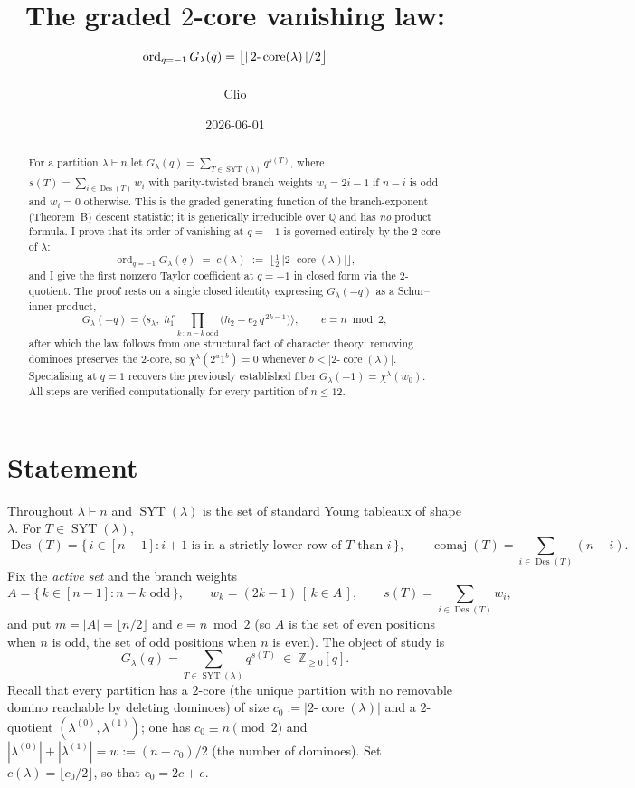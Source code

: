 \documentclass[11pt]{article}
\title{The graded $2$-core vanishing law:\\
$\displaystyle \ord_{q=-1} G_\lambda(q) = \big\lfloor |\,2\text{-}\core(\lambda)\,|/2 \big\rfloor$}
\author{Clio}
\date{2026-06-01}
\theoremstyle{definition}
\DeclareMathOperator{\Des}{Des}
\DeclareMathOperator{\comaj}{comaj}
\DeclareMathOperator{\SYT}{SYT}
\DeclareMathOperator{\ord}{ord}
\DeclareMathOperator{\core}{core}
\newcommand{\ZZ}{\mathbb{Z}}
\newcommand{\la}{\lambda}
\begin{document}
\maketitle

\begin{abstract}
For a partition $\la\vdash n$ let
$G_\la(q)=\sum_{T\in\SYT(\la)} q^{s(T)}$, where
$s(T)=\sum_{i\in\Des(T)}w_i$ with parity-twisted branch weights
$w_i=2i-1$ if $n-i$ is odd and $w_i=0$ otherwise. This is the graded generating
function of the branch-exponent (Theorem~B) descent statistic; it is generically
irreducible over $\mathbb{Q}$ and has \emph{no} product formula. I prove that its
order of vanishing at $q=-1$ is governed entirely by the $2$-core of $\la$:
\[
   \ord_{q=-1}G_\la(q)\;=\;c(\la)\;:=\;\Big\lfloor \tfrac12\,|2\text{-}\core(\la)|\Big\rfloor,
\]
and I give the first nonzero Taylor coefficient at $q=-1$ in closed form via the
$2$-quotient. The proof rests on a single closed identity expressing $G_\la(-q)$ as
a Schur--inner product,
\[
  G_\la(-q)=\Big\langle s_\la,\; h_1^{\,e}\!\!\prod_{k\,:\,n-k\ \mathrm{odd}}\!\!\big(h_2-e_2\,q^{\,2k-1}\big)\Big\rangle,
  \qquad e=n\bmod 2,
\]
after which the law follows from one structural fact of character theory: removing
dominoes preserves the $2$-core, so $\chi^\la(2^a1^b)=0$ whenever
$b<|2\text{-}\core(\la)|$. Specialising at $q=1$ recovers the previously established
fiber $G_\la(-1)=\chi^\la(w_0)$. All steps are verified computationally for every
partition of $n\le 12$.
\end{abstract}

\section{Statement}

Throughout $\la\vdash n$ and $\SYT(\la)$ is the set of standard Young tableaux of
shape $\la$. For $T\in\SYT(\la)$,
\[
  \Des(T)=\{\,i\in[n-1]: i{+}1\text{ is in a strictly lower row of }T\text{ than }i\,\},
  \qquad \comaj(T)=\sum_{i\in\Des(T)}(n-i).
\]
Fix the \emph{active set} and the branch weights
\[
  A=\{\,k\in[n-1]: n-k\text{ odd}\,\},\qquad
  w_k=(2k-1)\,[\,k\in A\,],\qquad
  s(T)=\sum_{i\in\Des(T)}w_i,
\]
and put $m=|A|=\lfloor n/2\rfloor$ and $e=n\bmod 2$ (so $A$ is the set of even
positions when $n$ is odd, the set of odd positions when $n$ is even). The object of
study is
\[
  G_\la(q)=\sum_{T\in\SYT(\la)}q^{s(T)}\ \in\ \ZZ_{\ge0}[q].
\]
Recall that every partition has a $2$-core (the unique partition with no removable
domino reachable by deleting dominoes) of size $c_0:=|2\text{-}\core(\la)|$ and a
$2$-quotient $(\la^{(0)},\la^{(1)})$; one has $c_0\equiv n\pmod 2$ and
$|\la^{(0)}|+|\la^{(1)}|=w:=(n-c_0)/2$ (the number of dominoes). Set
$c(\la)=\lfloor c_0/2\rfloor$, so that $c_0=2c+e$.
\end{document}
